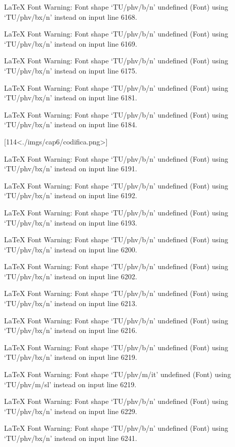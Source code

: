 LaTeX Font Warning: Font shape `TU/phv/b/n' undefined
(Font)              using `TU/phv/bx/n' instead on input line 6168.


LaTeX Font Warning: Font shape `TU/phv/b/n' undefined
(Font)              using `TU/phv/bx/n' instead on input line 6169.


LaTeX Font Warning: Font shape `TU/phv/b/n' undefined
(Font)              using `TU/phv/bx/n' instead on input line 6175.


LaTeX Font Warning: Font shape `TU/phv/b/n' undefined
(Font)              using `TU/phv/bx/n' instead on input line 6181.


LaTeX Font Warning: Font shape `TU/phv/b/n' undefined
(Font)              using `TU/phv/bx/n' instead on input line 6184.

[114<./imgs/cap6/codifica.png>]

LaTeX Font Warning: Font shape `TU/phv/b/n' undefined
(Font)              using `TU/phv/bx/n' instead on input line 6191.


LaTeX Font Warning: Font shape `TU/phv/b/n' undefined
(Font)              using `TU/phv/bx/n' instead on input line 6192.


LaTeX Font Warning: Font shape `TU/phv/b/n' undefined
(Font)              using `TU/phv/bx/n' instead on input line 6193.


LaTeX Font Warning: Font shape `TU/phv/b/n' undefined
(Font)              using `TU/phv/bx/n' instead on input line 6200.


LaTeX Font Warning: Font shape `TU/phv/b/n' undefined
(Font)              using `TU/phv/bx/n' instead on input line 6202.


LaTeX Font Warning: Font shape `TU/phv/b/n' undefined
(Font)              using `TU/phv/bx/n' instead on input line 6213.


LaTeX Font Warning: Font shape `TU/phv/b/n' undefined
(Font)              using `TU/phv/bx/n' instead on input line 6216.


LaTeX Font Warning: Font shape `TU/phv/b/n' undefined
(Font)              using `TU/phv/bx/n' instead on input line 6219.


LaTeX Font Warning: Font shape `TU/phv/m/it' undefined
(Font)              using `TU/phv/m/sl' instead on input line 6219.


LaTeX Font Warning: Font shape `TU/phv/b/n' undefined
(Font)              using `TU/phv/bx/n' instead on input line 6229.


LaTeX Font Warning: Font shape `TU/phv/b/n' undefined
(Font)              using `TU/phv/bx/n' instead on input line 6241.


